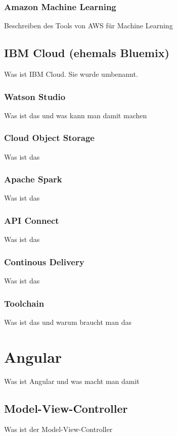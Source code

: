 \subsubsection{Amazon Machine Learning}
Beschreiben des Tools von AWS für Machine Learning

\subsection{IBM Cloud (ehemals Bluemix)}
Was ist IBM Cloud. Sie wurde umbenannt.

\subsubsection{Watson Studio}
Was ist das und was kann man damit machen

\subsubsection{Cloud Object Storage}
Was ist das

\subsubsection{Apache Spark}
Was ist das

\subsubsection{API Connect}
Was ist das

\subsubsection{Continous Delivery}
Was ist das

\subsubsection{Toolchain}
Was ist das und warum braucht man das

\section{Angular}
Was ist Angular und was macht man damit

\subsection{Model-View-Controller}
Was ist der Model-View-Controller

